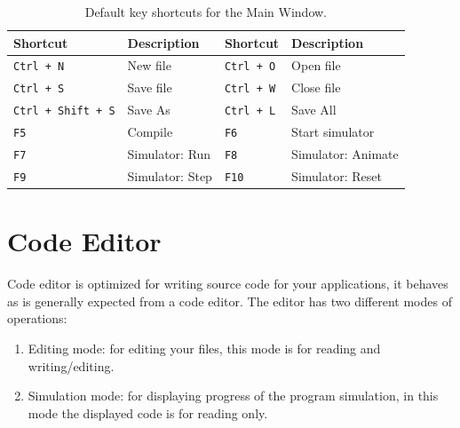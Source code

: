             \begin{table}[h!]
                \centering
                \fontsize{8pt}{9pt}
                {
                    \begin{tabular}{|ll|ll|}
                        \hline
                        \textbf{Shortcut}               & \textbf{Description}          &
                        \textbf{Shortcut}               & \textbf{Description}          \\\hline
                        \texttt{Ctrl + N}               & New file                      &
                        \texttt{Ctrl + O}               & Open file                     \\
                        \texttt{Ctrl + S}               & Save file                     &
                        \texttt{Ctrl + W}               & Close file                    \\
                        \texttt{Ctrl + Shift + S}       & Save As                       &
                        \texttt{Ctrl + L}               & Save All                      \\
                        \texttt{F5}                     & Compile                       &
                        \texttt{F6}                     & Start simulator               \\
                        \texttt{F7}                     & Simulator: Run                &
                        \texttt{F8}                     & Simulator: Animate            \\
                        \texttt{F9}                     & Simulator: Step               &
                        \texttt{F10}                    & Simulator: Reset              \\
                        \hline
                    \end{tabular}
                }
                \caption{Default key shortcuts for the Main Window.}
            \end{table}

\clearpage
\section{Code Editor}
    Code editor is optimized for writing source code for your applications, it behaves as is generally expected from a code editor. The editor has two different modes of operations:

    \begin{enumerate}
        \item Editing mode: for editing your files, this mode is for reading and writing/editing.
        \item Simulation mode: for displaying progress of the program simulation, in this mode the displayed code is for reading only.
    \end{enumerate}

